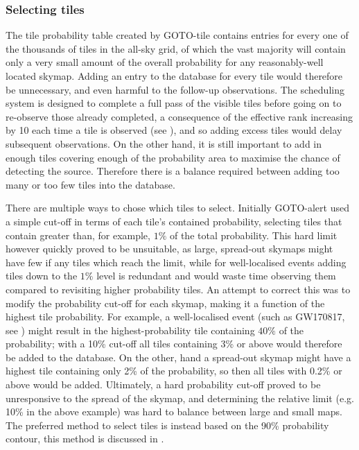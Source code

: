 \begin{colsection}
\begin{colsection}
\subsubsection{Selecting tiles}

The tile probability table created by GOTO-tile contains entries for every one of the thousands of tiles in the all-sky grid, of which the vast majority will contain only a very small amount of the overall probability for any reasonably-well located skymap. Adding an entry to the database for every tile would therefore be unnecessary, and even harmful to the follow-up observations. The scheduling system is designed to complete a full pass of the visible tiles before going on to re-observe those already completed, a consequence of the effective rank increasing by 10 each time a tile is observed (see ), and so adding excess tiles would delay subsequent observations. On the other hand, it is still important to add in enough tiles covering enough of the probability area to maximise the chance of detecting the source. Therefore there is a balance required between adding too many or too few tiles into the database.

There are multiple ways to chose which tiles to select. Initially GOTO-alert used a simple cut-off in terms of each tile's contained probability, selecting tiles that contain greater than, for example, $1\%$ of the total probability. This hard limit however quickly proved to be unsuitable, as large, spread-out skymaps might have few if any tiles which reach the limit, while for well-localised events adding tiles down to the $1\%$ level is redundant and would waste time observing them compared to revisiting higher probability tiles. An attempt to correct this was to modify the probability cut-off for each skymap, making it a function of the highest tile probability. For example, a well-localised event (such as GW170817, see ) might result in the highest-probability tile containing $40\%$ of the probability; with a 10\% cut-off all tiles containing 3\% or above would therefore be added to the database. On the other, hand a spread-out skymap might have a highest tile containing only 2\% of the probability, so then all tiles with 0.2\% or above would be added. Ultimately, a hard probability cut-off proved to be unresponsive to the spread of the skymap, and determining the relative limit (e.g. 10\% in the above example) was hard to balance between large and small maps. The preferred method to select tiles is instead based on the 90\% probability contour, this method is discussed in .


\end{colsection}
\end{colsection}
